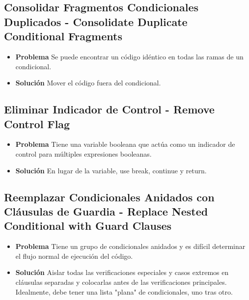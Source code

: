 \documentclass[11pt,a4paper,oneside]{book}
\begin{document}
\subsection{Consolidar Fragmentos Condicionales Duplicados - Consolidate Duplicate Conditional Fragments} 
\begin{itemize}
    \item \textbf{Problema} Se puede encontrar un código idéntico en todas las ramas de un condicional.
    
    
    
    \item \textbf{Solución} Mover el código fuera del condicional.
    
    
\end{itemize}
    
\subsection{Eliminar Indicador de Control - Remove Control Flag} 
 \begin{itemize}
    \item \textbf{Problema} Tiene una variable booleana que actúa como un indicador de control para múltiples expresiones booleanas.
    \item \textbf{Solución} En lugar de la variable, use break, continue y return.
\end{itemize}
    
\subsection{Reemplazar Condicionales Anidados con Cláusulas de Guardia - Replace Nested Conditional with Guard Clauses} 
\label{replaceNestedConditionalWithGuardClauses}
 \begin{itemize}
    \item \textbf{Problema} Tiene un grupo de condicionales anidados y es difícil determinar el flujo normal de ejecución del código.
    
    
    
    \item \textbf{Solución} Aislar todas las verificaciones especiales y casos extremos en cláusulas separadas y colocarlas antes de las verificaciones principales. Idealmente, debe tener una lista "plana" de condicionales, uno tras otro.
    
    
\end{itemize}
    
\end{document}
